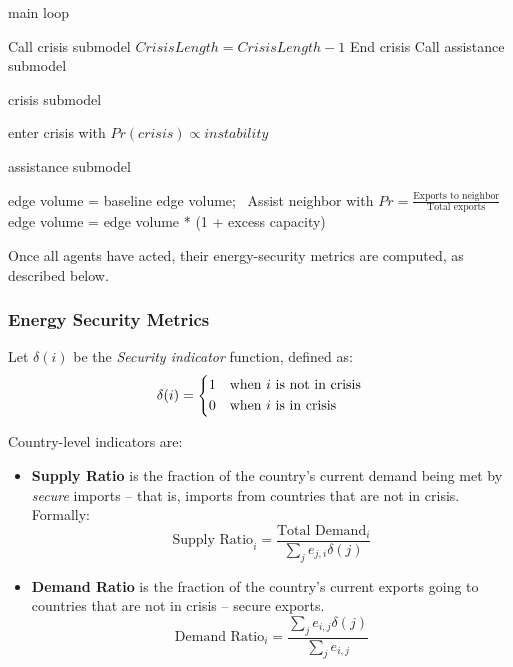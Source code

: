 \documentclass{article}
\begin{document}
\begin{algorithm}[H]
	\caption{main loop}
	 {
			Call crisis submodel \;
		}{
			$Crisis Length = Crisis Length - 1$ \;
			 { End crisis \; }
		}
	 {
		Call assistance submodel \;
	}	
\end{algorithm}

\begin{algorithm}[H]
	\caption{crisis submodel}
		enter crisis with $Pr(crisis) \propto instability$ \;
\end{algorithm}


\begin{algorithm}[H]
	\caption{assistance submodel}
	 {
			 {
				 {
					edge volume = baseline edge volume;\
				}
			}
		} {
			 {
				 {
					Assist neighbor with $Pr = \frac{\text{Exports to neighbor}}{\text{Total exports}}$
				}
			}
			 {
				 {
					edge volume = edge volume * (1 + excess capacity)\;
				}
			}
		}

\end{algorithm}

Once all agents have acted, their energy-security metrics are computed, as described below.

\subsubsection{Energy Security Metrics}

Let $\delta(i)$ be the \emph{Security indicator} function, defined as:
\[
\delta(i) = \begin{dcases*}
	1 & when $i$ is not in crisis\\
	0 & when $i$ is in crisis
\end{dcases*}
\]

Country-level indicators are:

\begin{itemize}
	\item \textbf{Supply Ratio} is the fraction of the country's current demand being met by \emph{secure} imports -- that is, imports from countries that are not in crisis. Formally:
	$$
		\text{Supply Ratio}_i = \frac{\text{Total Demand}_i}{\sum_{j}e_{j,i}\delta(j)}
	$$
\item \textbf{Demand Ratio} is the fraction of the country's current exports going to countries that are not in crisis -- secure exports. 
$$
\text{Demand Ratio}_i = \frac{\sum_{j}e_{i,j}\delta(j)}{\sum_{j}e_{i,j}}
$$
\end{itemize}
\end{document}
